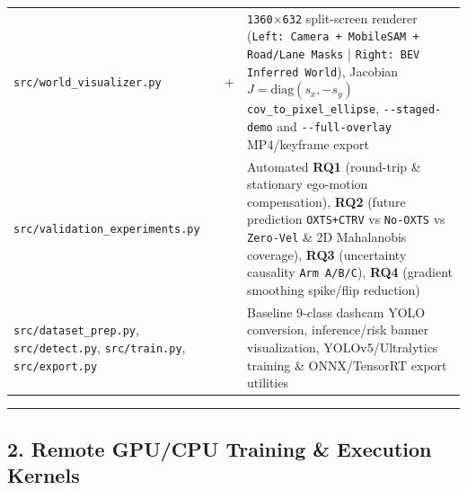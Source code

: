 \documentclass[10.5pt,a4paper]{article}
\begin{document}
\begin{footnotesize}
\begin{longtable}{>{\raggedright\arraybackslash}p{} >{\raggedright\arraybackslash}p{} >{\raggedright\arraybackslash}p{}}
\texttt{src/\allowbreak{}world\_\allowbreak{}visualizer.\allowbreak{}py} & 710+ & \texttt{1360$\times$632} split-screen renderer (\texttt{Left:\allowbreak{} Camera + MobileSAM + Road/\allowbreak{}Lane Masks} | \texttt{Right:\allowbreak{} BEV Inferred World}), Jacobian $J=\text{diag}(s_x,-s_y)$ \texttt{cov\_\allowbreak{}to\_\allowbreak{}pixel\_\allowbreak{}ellipse}, \texttt{-\allowbreak{}-\allowbreak{}staged-\allowbreak{}demo} and \texttt{-\allowbreak{}-\allowbreak{}full-\allowbreak{}overlay} MP4/keyframe export \\
\texttt{src/\allowbreak{}validation\_\allowbreak{}experiments.\allowbreak{}py} & 499 & Automated \textbf{RQ1} (round-trip \& stationary ego-motion compensation), \textbf{RQ2} (future prediction \texttt{OXTS+CTRV} vs \texttt{No-\allowbreak{}OXTS} vs \texttt{Zero-\allowbreak{}Vel} \& 2D Mahalanobis coverage), \textbf{RQ3} (uncertainty causality \texttt{Arm A/\allowbreak{}B/\allowbreak{}C}), \textbf{RQ4} (gradient smoothing spike/flip reduction) \\
\texttt{src/\allowbreak{}dataset\_\allowbreak{}prep.\allowbreak{}py}, \texttt{src/\allowbreak{}detect.\allowbreak{}py}, \texttt{src/\allowbreak{}train.\allowbreak{}py}, \texttt{src/\allowbreak{}export.\allowbreak{}py} & 377 & Baseline 9-class dashcam YOLO conversion, inference/risk banner visualization, YOLOv5/Ultralytics training \& ONNX/TensorRT export utilities \\
\end{longtable}
\end{footnotesize}


\par\noindent\rule{\textwidth}{0.4pt}\par\medskip

\subsection{2. Remote GPU/CPU Training \& Execution Kernels}
\end{document}
